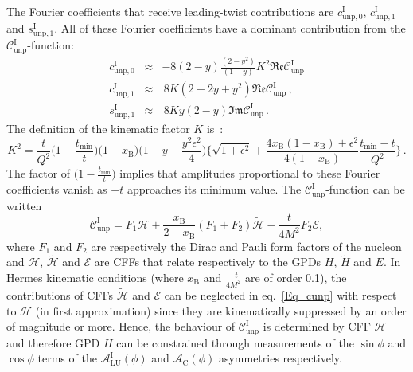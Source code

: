 \documentclass[11pt,a4paper]{article}
\begin{document}
The Fourier coefficients that receive leading-twist contributions are $c_{\textrm{unp},0}^{\textrm{I}}$, $c_{\textrm{unp},1}^{\textrm{I}}$ and $s_{\textrm{unp},1}^{\textrm{I}}$. All of these Fourier coefficients have a dominant contribution from the $\mathcal{C}_{\textrm{unp}}^{\textrm{I}}$-function:
\begin{eqnarray}
c_{\textrm{unp},0}^{\textrm{I}} &\approx&-8(2-y)\frac{(2-y^2)}{(1-y)}K^2\mathfrak{Re}\mathcal{C}_{\textrm{unp}}^{\textrm{I}}\label{eq:c0}
\\
c_{\textrm{unp},1}^{\textrm{I}} &\approx&\,8K(2- 2y + y^{2})\mathfrak{Re}\mathcal{C}_{\textrm{unp}}^{\textrm{I}}\,,\label{eq:c1}
\\
s_{\textrm{unp},1}^{\textrm{I}} &\approx&\,8Ky(2-y)\mathfrak{Im}\mathcal{C}_{\textrm{unp}}^{\textrm{I}}\,. \label{eq:s1}
\end{eqnarray}
The definition of the kinematic factor $K$ is~\cite{Bel02b}:
\begin{equation}
K^2=\frac{t}{Q^2}\Big(1-\frac{t_{\textrm{min}}}{t}\Big)\Big(1-x_{\textrm{B}}\Big)\Big(1-y-\frac{y^2\epsilon^2}{4}\Big)\Big\lbrace\sqrt{1+\epsilon^2}+\frac{4x_{\textrm{B}}(1-x_{\textrm{B}})+\epsilon^2}{4(1-x_{\textrm{B}})}
\frac{t_{\textrm{min}}-t}{Q^2}\Big\rbrace\,.\label{eq:K}
\end{equation} 
The factor of $\Big(1-\frac{t_{\textrm{min}}}{t}\Big)$ implies that amplitudes proportional to these Fourier coefficients vanish as $-t$ approaches its minimum value.
The $\mathcal{C}_{\textrm{unp}}^{\textrm{I}}$-function can be
written
\cite{Bel02b} 
\begin{equation}
 \mathcal{C}_{\textrm{unp}}^{\textrm{I}} = F_{1}\mathcal{H} + \frac{x_{\textrm{B}}}{2-x_{\textrm{B}}}(F_{1}+F_{2})\widetilde{\mathcal{H}} -\frac{t}{4M^{2}}F_{2}\mathcal{E},
\label{Eq_cunp}
\end{equation}
where $F_{1}$ and $F_{2}$ are respectively the Dirac and Pauli form
factors of the nucleon and $\mathcal{H}$, $\widetilde{\mathcal{H}}$ and
$\mathcal{E}$ are CFFs that relate respectively to the GPDs $H$,
$\widetilde{H}$ and $E$.  In H{\sc ermes} kinematic
conditions (where $x_{\textrm{B}}$ and $\frac{-t}{4M^2}$ are of order 0.1), the
contributions of CFFs $\widetilde{\mathcal{H}}$ and $\mathcal{E}$ can be
neglected in eq.~\ref{Eq_cunp} with respect to $\mathcal{H}$ (in first approximation) since they
are kinematically suppressed by an order of magnitude or more.
Hence, the behaviour of
$\mathcal{C}_{\textrm{unp}}^{\textrm{I}}$ is determined by CFF $\mathcal{H}$
and therefore GPD $H$ can be constrained through
measurements of the $\sin\phi$ and $\cos\phi$ terms of the $\mathcal{A}^{\textrm{I}}_{\textrm{LU}}(\phi)$ and $\mathcal{A}_{\textrm{C}}(\phi)$ asymmetries respectively.
\end{document}
